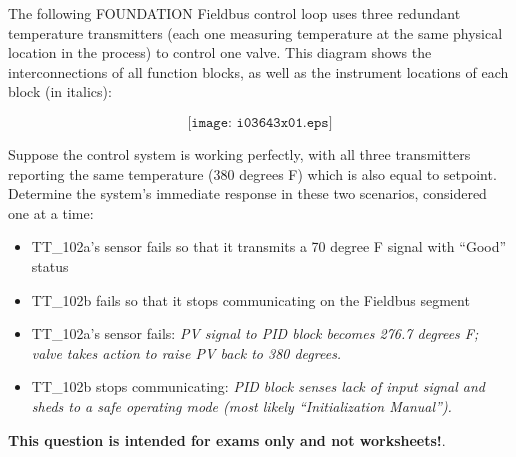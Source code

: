 

The following FOUNDATION Fieldbus control loop uses three redundant temperature transmitters (each one measuring temperature at the same physical location in the process) to control one valve.  This diagram shows the interconnections of all function blocks, as well as the instrument locations of each block (in italics):

$$\texttt{[image: i03643x01.eps]}$$

Suppose the control system is working perfectly, with all three transmitters reporting the same temperature (380 degrees F) which is also equal to setpoint.  Determine the system's immediate response in these two scenarios, considered one at a time:

\vskip 10pt

\begin{itemize}
\item{} TT\_102a's sensor fails so that it transmits a 70 degree F signal with ``Good'' status
\vskip 20pt
\item{} TT\_102b fails so that it stops communicating on the Fieldbus segment
\vskip 20pt
\end{itemize}







\begin{itemize}
\item{} TT\_102a's sensor fails: {\it PV signal to PID block becomes 276.7 degrees F; valve takes action to raise PV back to 380 degrees.}
\item{} TT\_102b stops communicating: {\it PID block senses lack of input signal and sheds to a safe operating mode (most likely ``Initialization Manual'').}
\end{itemize}







{\bf This question is intended for exams only and not worksheets!}.



